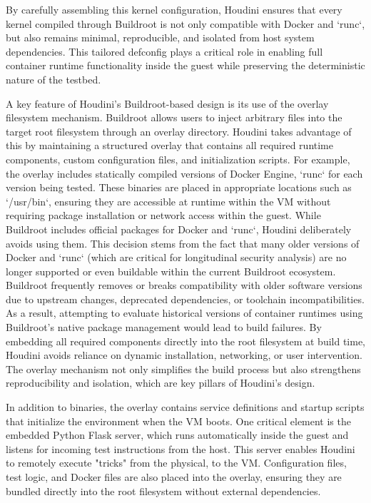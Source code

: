 \documentclass[12pt]{report}
\begin{document}
\begin{doublespace}
By carefully assembling this kernel configuration, Houdini ensures that every kernel compiled through Buildroot is not only compatible with Docker and `runc`, but also remains minimal, reproducible, and isolated from host system dependencies. This tailored defconfig plays a critical role in enabling full container runtime functionality inside the guest while preserving the deterministic nature of the testbed.

A key feature of Houdini’s Buildroot-based design is its use of the overlay filesystem mechanism. Buildroot allows users to inject arbitrary files into the target root filesystem through an overlay directory. Houdini takes advantage of this by maintaining a structured overlay that contains all required runtime components, custom configuration files, and initialization scripts. For example, the overlay includes statically compiled versions of Docker Engine, `runc` for each version being tested. These binaries are placed in appropriate locations such as `/usr/bin`, ensuring they are accessible at runtime within the VM without requiring package installation or network access within the guest. While Buildroot includes official packages for Docker and `runc`, Houdini deliberately avoids using them. This decision stems from the fact that many older versions of Docker and `runc` (which are critical for longitudinal security analysis) are no longer supported or even buildable within the current Buildroot ecosystem. Buildroot frequently removes or breaks compatibility with older software versions due to upstream changes, deprecated dependencies, or toolchain incompatibilities. As a result, attempting to evaluate historical versions of container runtimes using Buildroot’s native package management would lead to build failures. By embedding all required components directly into the root filesystem at build time, Houdini avoids reliance on dynamic installation, networking, or user intervention. The overlay mechanism not only simplifies the build process but also strengthens reproducibility and isolation, which are key pillars of Houdini’s design.

In addition to binaries, the overlay contains service definitions and startup scripts that initialize the environment when the VM boots. One critical element is the embedded Python Flask server, which runs automatically inside the guest and listens for incoming test instructions from the host. This server enables Houdini to remotely execute "tricks" from the physical, to the VM. Configuration files, test logic, and Docker files are also placed into the overlay, ensuring they are bundled directly into the root filesystem without external dependencies.


\end{doublespace}
\end{document}
